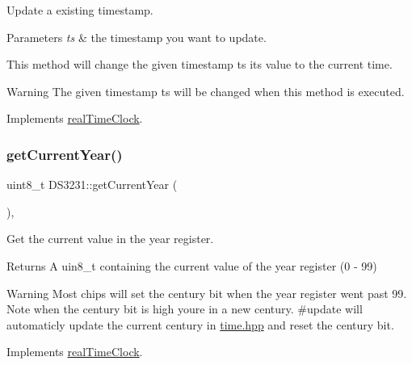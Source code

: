 Update a existing timestamp. 


\begin{DoxyParams}{Parameters}
{\em ts} & the timestamp you want to update.\\
\hline
\end{DoxyParams}
This method will change the given timestamp ts its value to the current time. \begin{DoxyWarning}{Warning}
The given timestamp ts will be changed when this method is executed. 
\end{DoxyWarning}


Implements \mbox{\hyperlink{classreal_time_clock_aa7402c5941b089d4e86b2af20d48b7ba}{real\+Time\+Clock}}.

\mbox{\label{class_d_s3231_a28a340b10b045ad1e8b94532a57c3759}} 
\subsubsection{\texorpdfstring{get\+Current\+Year()}{getCurrentYear()}}
{\footnotesize\ttfamily uint8\+\_\+t D\+S3231\+::get\+Current\+Year (\begin{DoxyParamCaption}{ }\end{DoxyParamCaption})\hspace{0.3cm}{\ttfamily [override]}, {\ttfamily [virtual]}}



Get the current value in the year register. 

\begin{DoxyReturn}{Returns}
A uin8\+\_\+t containing the current value of the year register (0 -\/ 99) 
\end{DoxyReturn}
\begin{DoxyWarning}{Warning}
Most chips will set the century bit when the year register went past 99. Note when the century bit is high you\textquotesingle{}re in a new century. \#update will automaticly update the current century in \mbox{\hyperlink{time_8hpp_source}{time.\+hpp}} and reset the century bit. 
\end{DoxyWarning}


Implements \mbox{\hyperlink{classreal_time_clock_a0cb99c34e2d6a089a62c8bea760c5add}{real\+Time\+Clock}}.

\mbox{\label{class_d_s3231_a6477bd1bb91d3df6a088c369692f46a3}} 
